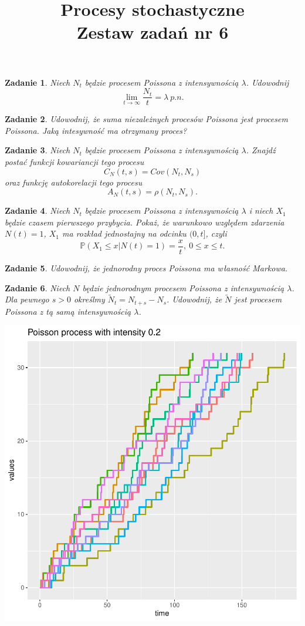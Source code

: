 \documentclass{mwart}
\title{Procesy stochastyczne\\ Zestaw zadań nr 6}
\newtheorem{zd}{Zadanie}
\begin{document}

\maketitle
\begin{zd}
	Niech $N_t$ będzie procesem Poissona z intensywnością $\lambda$. Udowodnij
	\begin{displaymath}
	\lim_{t\to \infty}\frac{N_t}{t} = \lambda\ p.n.
	\end{displaymath}
\end{zd}
\begin{zd}
	Udowodnij, że suma niezależnych procesów Poissona jest procesem Poissona. Jaką intesywność ma otrzymany proces?
\end{zd}
\begin{zd}
Niech $N_t$ będzie procesem Poissona z intensywnością $\lambda$. Znajdź postać funkcji kowariancji tego procesu
\begin{displaymath}
C_N(t,s) = Cov(N_t, N_s)
\end{displaymath}
oraz funkcję autokorelacji tego procesu
\begin{displaymath}
	A_N(t,s) = \rho\left(N_t, N_s\right).
\end{displaymath}
\end{zd}
\begin{zd}
	Niech $N_t$ będzie procesem Poissona z intensywnością $\lambda$ i niech $X_1$ będzie czasem pierwszego przybycia. Pokaż, że warunkowo względem zdarzenia $N(t) = 1$, $X_1$ ma rozkład jednostajny na odcinku $(0,t]$, czyli
	\begin{displaymath}
	\mathbb{P}\left(X_1 \leq x|N(t) = 1\right) = \frac{x}{t},\ 0\leq x\leq t.
	\end{displaymath}
\end{zd}
\begin{zd}
Udowodnij, że jednorodny proces Poissona ma własność Markowa.
\end{zd}
\begin{zd}
Niech $N$ będzie jednorodnym procesem Poissona z intensywnością $\lambda$. Dla pewnego $s>0$ określmy $\tilde{N}_t = N_{t+s} - N_s$. Udowodnij, że $\tilde{N}$ jest procesem Poissona z tą samą intensywnością $\lambda$.
\end{zd}
\includegraphics{Zestaw6_PS_2020-001}
\end{document}
